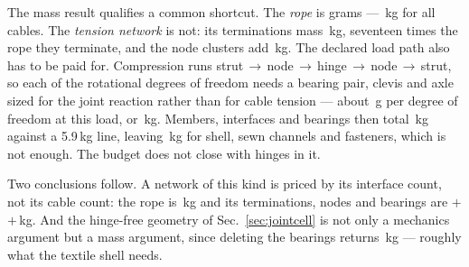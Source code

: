 \documentclass[conference]{IEEEtran}
\begin{document}
The mass result qualifies a common shortcut. The \emph{rope} is grams ---
\ropeMass\,kg for all \numTendonCable{} cables. The \emph{tension network} is
not: its \numCableEnds{} terminations mass \termMass\,kg, seventeen times the
rope they terminate, and the \nodeCount{} node clusters add \nodeMass\,kg.
The declared load path also has to be paid for. Compression runs
strut\,$\rightarrow$\,node\,$\rightarrow$\,hinge\,$\rightarrow$\,node\,$\rightarrow$\,strut,
so each of the \hingeDofCount{} rotational degrees of freedom needs a bearing
pair, clevis and axle sized for the joint reaction rather than for cable
tension --- about \bearingPerDof\,g per degree of freedom at this load, or
\bearingMass\,kg. Members, interfaces and bearings then total
\membersMass\,kg against a 5.9\,kg line, leaving \shellAllowance\,kg for
shell, sewn channels and fasteners, which is not enough. The budget does not
close with hinges in it.

Two conclusions follow. A network of this kind is priced by its interface
count, not its cable count: the rope is \ropeMass\,kg and its terminations,
nodes and bearings are \termMass$+$\nodeMass$+$\bearingMass\,kg. And the
hinge-free geometry of Sec.~\ref{sec:jointcell} is not only a mechanics
argument but a mass argument, since deleting the bearings returns
\bearingMass\,kg --- roughly what the textile shell needs.
\end{document}
